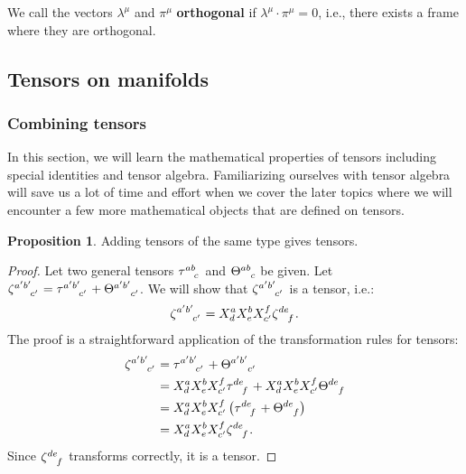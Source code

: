 \documentclass{article}
\theoremstyle{definition}
\newtheorem{prop}{Proposition}[section]
\begin{document}
We call the vectors $\lambda^\mu$ and $\pi^\mu$ \textbf{orthogonal} if $\lambda^\mu\cdot\pi^\mu = 0$, i.e., there exists a frame where they are orthogonal.


\subsection{Tensors on manifolds}
\subsubsection{Combining tensors}
In this section, we will learn the mathematical properties of tensors including special identities and tensor algebra. Familiarizing ourselves with tensor algebra will save us a lot of time and effort when we cover the later topics where we will encounter a few more mathematical objects that are defined on tensors. \\

\begin{prop}
	Adding tensors of the same type gives tensors.
\end{prop}
\begin{proof}
	Let two general tensors $\tensor{\tau}{^{ab}_c}$ and $\tensor{\Theta}{^{ab}_c}$ be given. Let $\tensor{\zeta}{^{a'b'}_{c'}} = \tensor{\tau}{^{a'b'}_{c'}} + \tensor{\Theta}{^{a'b'}_{c'}}$. We will show that $\tensor{\zeta}{^{a'b'}_{c'}}$ is a tensor, i.e.:
	\begin{align*}
	\tensor{\zeta}{^{a'b'}_{c'}} = X^{a}_dX^{b}_eX^f_{c'}\tensor{\zeta}{^{de}_f}.
	\end{align*}
	The proof is a straightforward application of the transformation rules for tensors:
	\begin{align*}
	\tensor{\zeta}{^{a'b'}_{c'}} &= \tensor{\tau}{^{a'b'}_{c'}} + \tensor{\Theta}{^{a'b'}_{c'}} \\
	&= X^{a}_dX^{b}_eX^f_{c'}\tensor{\tau}{^{de}_{f}} + X^{a}_dX^{b}_eX^f_{c'}\tensor{\Theta}{^{de}_{f}}\\
	&= X^{a}_dX^{b}_eX^f_{c'}\left(\tensor{\tau}{^{de}_{f}} +  \tensor{\Theta}{^{de}_{f}}\right) \\
	&= X^{a}_dX^{b}_eX^f_{c'}\tensor{\zeta}{^{de}_{f}}.
	\end{align*}
	Since $\tensor{\zeta}{^{de}_{f}}$ transforms correctly, it is a tensor.
\end{proof}
\end{document}
